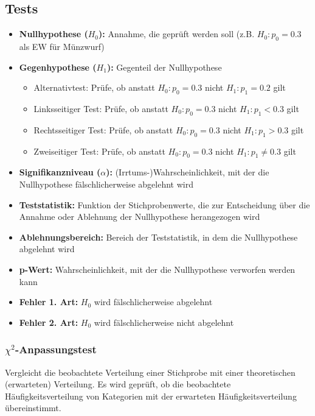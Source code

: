 \subsection{Tests}

\begin{itemize}
    \item \textbf{Nullhypothese (\(H_0\)):} Annahme, die geprüft werden soll (z.B. \(H_0: p_0=0.3\) als EW für Münzwurf)
    \item \textbf{Gegenhypothese (\(H_1\)):} Gegenteil der Nullhypothese
        \begin{itemize}
            \item Alternativtest: Prüfe, ob anstatt \(H_0: p_0=0.3\) nicht \(H_1: p_1=0.2\) gilt
            \item Linksseitiger Test: Prüfe, ob anstatt \(H_0: p_0=0.3\) nicht \(H_1: p_1<0.3\) gilt
            \item Rechtsseitiger Test: Prüfe, ob anstatt \(H_0: p_0=0.3\) nicht \(H_1: p_1>0.3\) gilt
            \item Zweiseitiger Test: Prüfe, ob anstatt \(H_0: p_0=0.3\) nicht \(H_1: p_1\neq0.3\) gilt
        \end{itemize}
    \item \textbf{Signifikanzniveau (\(\alpha\)):} (Irrtums-)Wahrscheinlichkeit, mit der die Nullhypothese fälschlicherweise abgelehnt wird
    \item \textbf{Teststatistik:} Funktion der Stichprobenwerte, die zur Entscheidung über die Annahme oder Ablehnung der Nullhypothese herangezogen wird
    \item \textbf{Ablehnungsbereich:} Bereich der Teststatistik, in dem die Nullhypothese abgelehnt wird
    \item \textbf{p-Wert:} Wahrscheinlichkeit, mit der die Nullhypothese verworfen werden kann
    \item \textbf{Fehler 1. Art:} \(H_0\) wird fälschlicherweise abgelehnt
    \item \textbf{Fehler 2. Art:} \(H_0\) wird fälschlicherweise nicht abgelehnt
\end{itemize}


\subsubsection{\(\chi^2\)-Anpassungstest}

Vergleicht die beobachtete Verteilung einer Stichprobe mit 
einer theoretischen (erwarteten) Verteilung. Es wird geprüft, 
ob die beobachtete Häufigkeitsverteilung von Kategorien mit der 
erwarteten Häufigkeitsverteilung übereinstimmt.\\

